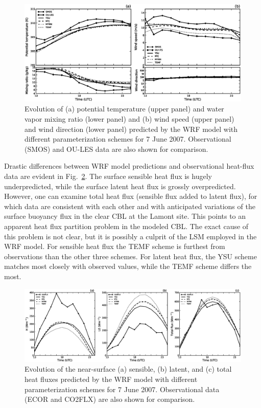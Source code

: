 \begin{figure}[ht!]
\begin{center}
\includegraphics[width=\textwidth]{figures/chapter4/meteogram_phys_20070607}
\end{center}
\caption{Evolution of (a) potential temperature (upper panel) and water vapor mixing ratio (lower panel) and (b) wind speed (upper panel) and wind direction (lower panel) predicted by the WRF model with different parameterization schemes for 7 June 2007. Observational (SMOS) and OU-LES data are also shown for comparison.}
\label{figure406}
\end{figure}


Drastic differences between WRF model predictions and observational heat-flux data are evident in Fig.~\ref{figure407}. The surface sensible heat flux is hugely underpredicted, while the surface latent heat flux is grossly overpredicted. However, one can examine total heat flux (sensible flux added to latent flux), for which data are consistent with each other and with anticipated variations of the surface buoyancy flux in the clear CBL at the Lamont site. This points to an apparent heat flux partition problem in the modeled CBL. The exact cause of this problem is not clear, but it is possibly a culprit of the LSM employed in the WRF model. For sensible heat flux the TEMF scheme is furthest from observations than the other three schemes. For latent heat flux, the YSU scheme matches most closely with observed values, while the TEMF scheme differs the most.


\begin{figure}[ht!]
\begin{center}
\includegraphics[width=\textwidth]{figures/chapter4/shf_lhf_phys_20070607}
\end{center}
\caption{Evolution of the near-surface (a) sensible, (b) latent, and (c) total heat fluxes predicted by the WRF model with different parameterization schemes for 7 June 2007. Observational data (ECOR and CO2FLX) are also shown for comparison.}
\label{figure407}
\end{figure}



